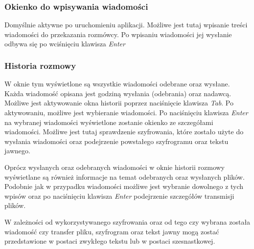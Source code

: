 \documentclass{article}
\begin{document}
    \subsubsection{Okienko do wpisywania wiadomości}
      Domyślnie aktywne po uruchomieniu aplikacji. Możliwe jest tutaj wpisanie treści wiadomości do przekazania
      rozmówcy. Po wpisaniu wiadomości jej wysłanie odbywa się po wciśnięciu klawisza \emph{Enter}
    \subsubsection{Historia rozmowy}
      W oknie tym wyświetlone są wszystkie wiadomości odebrane oraz wysłane. Każda wiadomość opisana jest godziną
      wysłania (odebrania) oraz nadawcą. Możliwe jest aktywowanie okna historii poprzez naciśnięcie klawisza
      \emph{Tab}. Po aktywowaniu, możliwe jest wybieranie wiadomości. Po naciśnięciu klawisza \emph{Enter} na 
      wybranej wiadomości wyświetlone zostanie okienko ze szczegółami wiadomości. Możliwe jest tutaj sprawdzenie
      szyfrowania, które zostało użyte do wysłania wiadomości oraz podejrzenie powstałego szyfrogramu oraz tekstu
      jawnego.

      Oprócz wysłanych oraz odebranych wiadomości w oknie historii rozmowy wyświetlane są również informacje na 
      temat odebranych oraz wysłanych plików. Podobnie jak w przypadku wiadomości możliwe jest wybranie dowolnego
      z tych wpisów oraz po naciśnięciu klawisza \emph{Enter} podejrzenie szczegółów transmisji plików.

      W zależności od wykorzystywanego szyfrowania oraz od tego czy wybrana została wiadomość czy transfer pliku,
      szyfrogram oraz tekst jawny mogą zostać przedstawione w postaci zwykłego tekstu lub w postaci szesnastkowej.
\end{document}
